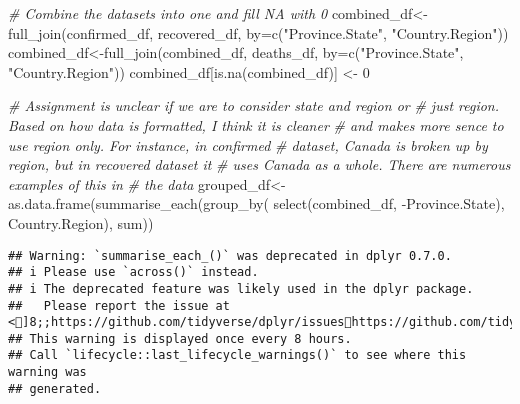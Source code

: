 \documentclass[
]{article}
\newenvironment{Shaded}{\begin{snugshade}}{\end{snugshade}}
\newcommand{\AttributeTok}[1]{\textcolor[rgb]{0.77,0.63,0.00}{#1}}
\newcommand{\CommentTok}[1]{\textcolor[rgb]{0.56,0.35,0.01}{\textit{#1}}}
\newcommand{\DecValTok}[1]{\textcolor[rgb]{0.00,0.00,0.81}{#1}}
\newcommand{\FunctionTok}[1]{\textcolor[rgb]{0.00,0.00,0.00}{#1}}
\newcommand{\NormalTok}[1]{#1}
\newcommand{\OtherTok}[1]{\textcolor[rgb]{0.56,0.35,0.01}{#1}}
\newcommand{\SpecialCharTok}[1]{\textcolor[rgb]{0.00,0.00,0.00}{#1}}
\newcommand{\StringTok}[1]{\textcolor[rgb]{0.31,0.60,0.02}{#1}}
\begin{document}
\begin{Shaded}
\begin{Highlighting}[]
\CommentTok{\# Combine the datasets into one and fill NA with 0}
\NormalTok{combined\_df}\OtherTok{\textless{}{-}}\FunctionTok{full\_join}\NormalTok{(confirmed\_df, recovered\_df, }
                       \AttributeTok{by=}\FunctionTok{c}\NormalTok{(}\StringTok{"Province.State"}\NormalTok{, }\StringTok{"Country.Region"}\NormalTok{))}
\NormalTok{combined\_df}\OtherTok{\textless{}{-}}\FunctionTok{full\_join}\NormalTok{(combined\_df, deaths\_df, }
                       \AttributeTok{by=}\FunctionTok{c}\NormalTok{(}\StringTok{"Province.State"}\NormalTok{, }\StringTok{"Country.Region"}\NormalTok{))}
\NormalTok{combined\_df[}\FunctionTok{is.na}\NormalTok{(combined\_df)] }\OtherTok{\textless{}{-}} \DecValTok{0}

\CommentTok{\# Assignment is unclear if we are to consider state and region or }
\CommentTok{\# just region. Based on how data is formatted, I think it is cleaner }
\CommentTok{\# and makes more sence to use region only.  For instance, in confirmed }
\CommentTok{\# dataset, Canada is broken up by region, but in recovered dataset it }
\CommentTok{\# uses Canada as a whole.  There are numerous examples of this in}
\CommentTok{\# the data}
\NormalTok{grouped\_df}\OtherTok{\textless{}{-}}\FunctionTok{as.data.frame}\NormalTok{(}\FunctionTok{summarise\_each}\NormalTok{(}\FunctionTok{group\_by}\NormalTok{(}
  \FunctionTok{select}\NormalTok{(combined\_df, }\SpecialCharTok{{-}}\NormalTok{Province.State), Country.Region), sum))}
\end{Highlighting}
\end{Shaded}

\begin{verbatim}
## Warning: `summarise_each_()` was deprecated in dplyr 0.7.0.
## i Please use `across()` instead.
## i The deprecated feature was likely used in the dplyr package.
##   Please report the issue at <]8;;https://github.com/tidyverse/dplyr/issueshttps://github.com/tidyverse/dplyr/issues]8;;>.
## This warning is displayed once every 8 hours.
## Call `lifecycle::last_lifecycle_warnings()` to see where this warning was
## generated.
\end{verbatim}

\begin{Shaded}
\end{Shaded}
\end{document}
